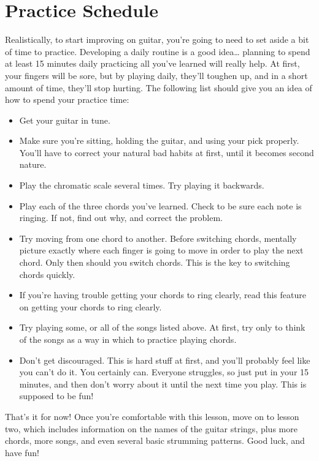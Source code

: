 \section{Practice Schedule}
Realistically, to start improving on guitar, you're going to need to set aside
a bit of time to practice. Developing a daily routine is a good idea\ldots{}
planning to spend at least 15 minutes daily practicing all you've learned will
really help. At first, your fingers will be sore, but by playing daily, they'll
toughen up, and in a short amount of time, they'll stop hurting. The following
list should give you an idea of how to spend your practice time:
%
\begin{itemize}
\item Get your guitar in tune.
\item Make sure you're sitting, holding the guitar, and using your pick
      properly. You'll have to correct your natural bad habits at first, until it
      becomes second nature.
\item Play the chromatic scale several times. Try playing it backwards.
\item Play each of the three chords you've learned. Check to be sure each note
      is ringing. If not, find out why, and correct the problem.
\item Try moving from one chord to another. Before switching chords, mentally
      picture exactly where each finger is going to move in order to play the next
      chord. Only then should you switch chords. This is the key to switching chords
      quickly. 
\item If you're having trouble getting your chords to ring clearly, read this
      feature on getting your chords to ring clearly.
\item Try playing some, or all of the songs listed above. At first, try only to
      think of the songs as a way in which to practice playing chords.
\item Don't get discouraged. This is hard stuff at first, and you'll probably
      feel like you can't do it. You certainly can. Everyone struggles, so just put
      in your 15 minutes, and then don't worry about it until the next time you play.
      This is supposed to be fun! 
\end{itemize}
%
That's it for now! Once you're comfortable with this lesson, move on to lesson
two, which includes information on the names of the guitar strings, plus more
chords, more songs, and even several basic strumming patterns. Good luck, and
have fun! 

